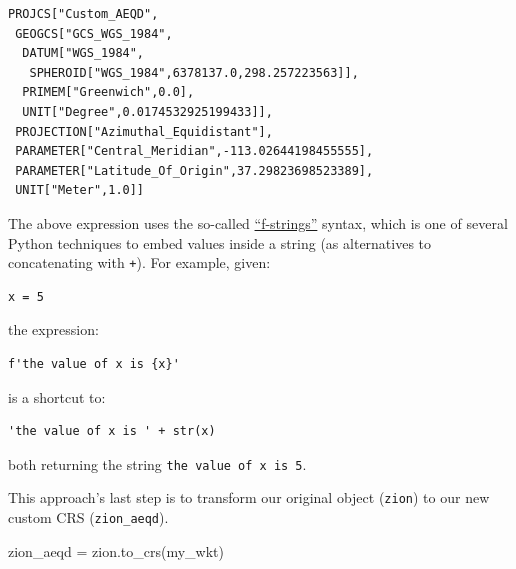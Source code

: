 \documentclass[
  letterpaper,
]{krantz}
\newenvironment{Shaded}{\begin{snugshade}}{\end{snugshade}}
\newcommand{\NormalTok}[1]{\textcolor[rgb]{0.00,0.23,0.31}{#1}}
\newcommand{\OperatorTok}[1]{\textcolor[rgb]{0.37,0.37,0.37}{#1}}
\begin{document}
\begin{verbatim}
PROJCS["Custom_AEQD",
 GEOGCS["GCS_WGS_1984",
  DATUM["WGS_1984",
   SPHEROID["WGS_1984",6378137.0,298.257223563]],
  PRIMEM["Greenwich",0.0],
  UNIT["Degree",0.0174532925199433]],
 PROJECTION["Azimuthal_Equidistant"],
 PARAMETER["Central_Meridian",-113.02644198455555],
 PARAMETER["Latitude_Of_Origin",37.29823698523389],
 UNIT["Meter",1.0]]
\end{verbatim}

\begin{tcolorbox}[enhanced jigsaw, title=\textcolor{quarto-callout-note-color}{\faInfo}\hspace{0.5em}{Note}, arc=.35mm, toprule=.15mm, titlerule=0mm, colframe=quarto-callout-note-color-frame, breakable, toptitle=1mm, bottomtitle=1mm, rightrule=.15mm, colbacktitle=quarto-callout-note-color!10!white, leftrule=.75mm, left=2mm, bottomrule=.15mm, opacityback=0, coltitle=black, opacitybacktitle=0.6, colback=white]

The above expression uses the so-called
\href{https://docs.python.org/3/tutorial/inputoutput.html\#tut-f-strings}{``f-strings''}
syntax, which is one of several Python techniques to embed values inside
a string (as alternatives to concatenating with \texttt{+}). For
example, given:

\begin{verbatim}
x = 5
\end{verbatim}

the expression:

\begin{verbatim}
f'the value of x is {x}'
\end{verbatim}

is a shortcut to:

\begin{verbatim}
'the value of x is ' + str(x)
\end{verbatim}

both returning the string
\texttt{\textquotesingle{}the\ value\ of\ x\ is\ 5\textquotesingle{}}.

\end{tcolorbox}

This approach's last step is to transform our original object
(\texttt{zion}) to our new custom CRS (\texttt{zion\_aeqd}).

\begin{Shaded}
\begin{Highlighting}[]
\NormalTok{zion\_aeqd }\OperatorTok{=}\NormalTok{ zion.to\_crs(my\_wkt)}
\end{Highlighting}
\end{Shaded}
\end{document}
